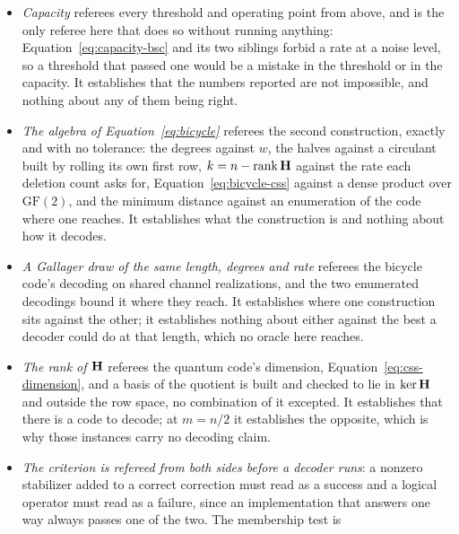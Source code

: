 \documentclass[11pt,a4paper]{article}
\begin{document}
\begin{itemize}
    every pair measured. It establishes that each code is the one named and
    that its decoder achieves what bounded distance guarantees; it
    establishes nothing about what a better decoder would achieve on the
    same code, which for a perfect code is the same number and for
    Reed--Solomon is not.
  \item \emph{Capacity} referees every threshold and operating point from
    above, and is the only referee here that does so without running
    anything: Equation~\ref{eq:capacity-bsc} and its two siblings forbid a
    rate at a noise level, so a threshold that passed one would be a mistake
    in the threshold or in the capacity. It establishes that the numbers
    reported are not impossible, and nothing about any of them being right.
  \item \emph{The algebra of Equation~\ref{eq:bicycle}} referees the second
    construction, exactly and with no tolerance: the degrees against $w$, the
    halves against a circulant built by rolling its own first row,
    $k = n - \operatorname{rank} \mathbf{H}$ against the rate each deletion
    count asks for, Equation~\ref{eq:bicycle-css} against a dense product over
    $\mathrm{GF}(2)$, and the minimum distance against an enumeration of the
    code where one reaches. It establishes what the construction is and
    nothing about how it decodes.
  \item \emph{A Gallager draw of the same length, degrees and rate} referees
    the bicycle code's decoding on shared channel realizations, and the two
    enumerated decodings bound it where they reach. It establishes where one
    construction sits against the other; it establishes nothing about either
    against the best a decoder could do at that length, which no oracle here
    reaches.
  \item \emph{The rank of $\mathbf{H}$} referees the quantum code's dimension,
    Equation~\ref{eq:css-dimension}, and a basis of the quotient is built and
    checked to lie in $\ker \mathbf{H}$ and outside the row space, no combination
    of it excepted. It establishes that there is a code to decode; at
    $m = n/2$ it establishes the opposite, which is why those instances carry
    no decoding claim.
  \item \emph{The criterion is refereed from both sides before a decoder runs}:
    a nonzero stabilizer added to a correct correction must read as a success
    and a logical operator must read as a failure, since an implementation
    that answers one way always passes one of the two. The membership test is

\end{itemize}
\end{document}
